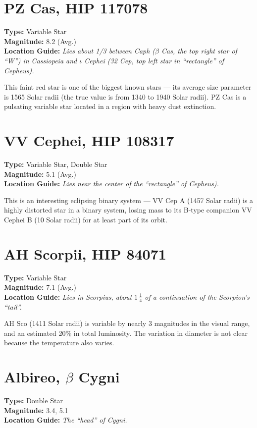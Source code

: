 \section{PZ Cas, HIP 117078}
\textbf{Type:} Variable Star \\
\textbf{Magnitude:} 8.2 (Avg.) \\
\textbf{Location Guide:} \textit{Lies about 1/3 between Caph ($\beta$
  Cas, the top right star of ``W'') in Cassiopeia and $\iota$ Cephei
  (32 Cep, top left star in ``rectangle'' of Cepheus).}

This faint red star is one of the biggest known stars --- its average
size parameter is 1565 Solar radii (the true value is from 1340 to
1940 Solar radii). PZ Cas is a pulsating variable star located in a
region with heavy dust extinction.


\section{VV Cephei, HIP 108317}
\textbf{Type:} Variable Star, Double Star \\
\textbf{Magnitude:} 5.1 (Avg.) \\
\textbf{Location Guide:} \textit{Lies near the center of the ``rectangle'' of Cepheus).}

This is an interesting eclipsing binary system --- VV Cep A (1457
Solar radii) is a highly distorted star in a binary system, losing
mass to its B-type companion VV Cephei B (10 Solar radii) for at least
part of its orbit.

\section{AH Scorpii, HIP 84071}
\textbf{Type:} Variable Star \\
\textbf{Magnitude:} 7.1 (Avg.) \\
\textbf{Location Guide:} \textit{Lies in Scorpius, about $1\,\frac{1}{4}$ of a continuation of the Scorpion's ``tail''.}

AH Sco (1411 Solar radii) is variable by nearly 3 magnitudes in the
visual range, and an estimated 20\% in total luminosity. The variation
in diameter is not clear because the temperature also varies.

\section{Albireo, \texorpdfstring{$\beta$}{beta} Cygni}
\textbf{Type:} Double Star \\
\textbf{Magnitude:} 3.4, 5.1 \\
\textbf{Location Guide:} \textit{The ``head'' of Cygni.}


